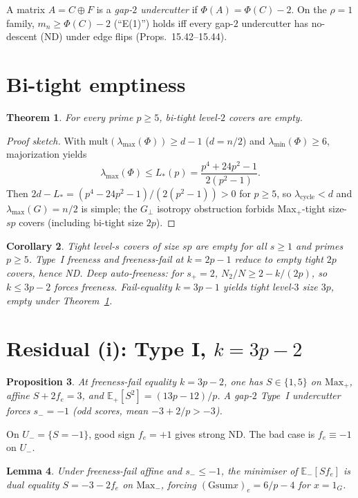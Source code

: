 \documentclass[10pt]{article}
\theoremstyle{plain}
\newtheorem{theorem}{Theorem}
\newtheorem{lemma}[theorem]{Lemma}
\newtheorem{proposition}[theorem]{Proposition}
\newtheorem{corollary}[theorem]{Corollary}
\theoremstyle{remark}
\newcommand{\Maxp}{\mathrm{Max}_{+}}
\newcommand{\Maxm}{\mathrm{Max}_{-}}
\newcommand{\Gsum}{\mathrm{Gsum}}
\newcommand{\ES}{\mathbb{E}}
\begin{document}
A matrix $A=C\oplus F$ is a \emph{gap-$2$ undercutter} if $\Phi(A)=\Phi(C)-2$.
On the $\rho=1$ family, $m_n\ge\Phi(C)-2$ (``E(1)'') holds iff every gap-$2$ undercutter
has no-descent (ND) under edge flips (Props.\ 15.42--15.44).

\section{Bi-tight emptiness}

\begin{theorem}
\label{thm:bitight}
For every prime $p\ge5$, bi-tight level-$2$ covers are empty.
\end{theorem}

\begin{proof}[Proof sketch]
With mult$(\lambda_{\max}(\Phi))\ge d-1$ ($d=n/2$) and $\lambda_{\min}(\Phi)\ge6$,
majorization yields
\[
\lambda_{\max}(\Phi)\le L_*(p)=\frac{p^4+24p^2-1}{2(p^2-1)}.
\]
Then $2d-L_*=(p^4-24p^2-1)/(2(p^2-1))>0$ for $p\ge5$, so
$\lambda_{\mathrm{cycle}}<d$ and $\lambda_{\max}(G)=n/2$ is simple; the $G_\perp$
isotropy obstruction forbids Max$_+$-tight size-$sp$ covers (including bi-tight size $2p$).
\end{proof}

\begin{corollary}
Tight level-$s$ covers of size $sp$ are empty for all $s\ge1$ and primes $p\ge5$.
Type~I freeness and freeness-fail at $k=2p-1$ reduce to empty tight $2p$ covers, hence ND.
Deep auto-freeness: for $s_+=2$, $N_2/N\ge2-k/(2p)$, so $k\le3p-2$ forces freeness.
Fail-equality $k=3p-1$ yields tight level-$3$ size $3p$, empty under Theorem~\ref{thm:bitight}.
\end{corollary}

\section{Residual (i): Type I, $k=3p-2$}

\begin{proposition}
At freeness-fail equality $k=3p-2$, one has $S\in\{1,5\}$ on $\Maxp$,
affine $S+2f_e=3$, and $\ES_+[S^2]=(13p-12)/p$.
A gap-$2$ Type~I undercutter forces $s_-=-1$ (odd scores, mean $-3+2/p>-3$).
\end{proposition}

On $U_-=\{S=-1\}$, good sign $f_e=+1$ gives strong ND. The bad case is $f_e\equiv-1$ on $U_-$.

\begin{lemma}
Under freeness-fail affine and $s_-\le-1$, the minimiser of $\ES_-[Sf_e]$ is dual equality
$S=-3-2f_e$ on $\Maxm$, forcing $(\Gsum x)_e=6/p-4$ for $x=1_G$.
\end{lemma}
\end{document}
